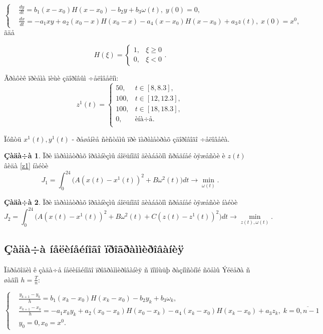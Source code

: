 \documentclass[14pt]{article}
\begin{document}
\begin{equation}\label{syst1}
\left\{ \begin{aligned}
& \frac{dy}{dt} = b_1(x-x_{0})H(x-x_{0}) - b_2 y+b_{3}\omega(t), \; y(0) = 0, \\
& \frac{dx}{dt} = - a_{1}xy+a_2(x_0-x)H(x_0-x)-a_4(x-x_0)H(x-x_0)+a_3 z(t), \; x(0) = x^0,
\end{aligned}\right.
\end{equation}
ãäå

$$
H(\xi) = \begin{cases} 1, & \xi \ge 0 \\ 0, & \xi < 0 \end{cases}.
$$

Ãðàôèê ïðèåìà ïèùè çäîðîâûì ÷åëîâåêîì:
\begin{equation}\label{z1}
z^1(t) = \begin{cases}
           50,& t \in [8, 8.3], \\
           100 , & t \in [12, 12.3], \\
           100 , & t \in [18,18.3],\\
           0, & \mbox{èíà÷å}. \\
\end{cases}
\end{equation}

Ïóñòü $ x^1(t), y^1(t) $ - ðåøåíèå ñèñòåìû ïðè ïàðàìåòðàõ çäîðîâîãî ÷åëîâåêà.

\textbf{Çàäà÷à 1}. Ïðè ïàðàìåòðàõ îðãàíèçìû áîëüíîãî äèàáåòîì ñðåäíåé òÿæåñòè è $z(t)$ âèäà \eqref{z1} íàéòè
$$
J_1 = \int_0^{24} \Big( A(x(t)-x^1(t))^2 + B\omega^2(t)\Big) dt \rightarrow \min_{\omega(t)}.
$$

\textbf{Çàäà÷à 2}. Ïðè ïàðàìåòðàõ îðãàíèçìû áîëüíîãî äèàáåòîì ñðåäíåé òÿæåñòè íàéòè
$$
J_2 = \int_0^{24} \Big( A(x(t)-x^1(t))^2 + B\omega^2(t) + C(z(t)-z^1(t))^2 \Big) dt \rightarrow \min_{z(t),\omega(t)}.
$$

\subsection{Çàäà÷à íåëèíåéíîãî ïðîãðàììèðîâàíèÿ}

Ïåðåõîäèì ê çàäà÷å íåëèíåéíîãî ïðîãðàììèðîâàíèÿ ñ ïîìîùüþ ðàçíîñòíîé ñõåìû Ýéëåðà ñ øàãîì $h=\frac{T}{n}$:

\begin{equation}\label{NLP1}
\left\{ \begin{aligned}
& \frac{y_{k+1}-y_k}{h} = b_1(x_k-x_0)H(x_k-x_0) - b_2 y_k+b_{3}\omega_k, \\
& \frac{x_{k+1}-x_k}{h} = - a_{1}x_k y_k+a_2(x_0-x_k)H(x_0-x_k)-a_4(x_k-x_0)H(x_k-x_0)+a_3 z_k,\; k = \overline{0,n-1} \\
& y_0 = 0 , x_0 = x^0.
\end{aligned}\right.
\end{equation}
\end{document}
